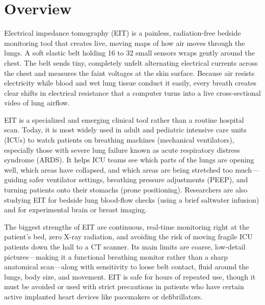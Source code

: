 \label{ch:infographic-eit}

\section{Overview}

Electrical impedance tomography (EIT) is a painless, radiation-free bedside monitoring tool that creates live, moving maps of how air moves through the lungs. A soft elastic belt holding 16 to 32 small sensors wraps gently around the chest. The belt sends tiny, completely unfelt alternating electrical currents across the chest and measures the faint voltages at the skin surface. Because air resists electricity while blood and wet lung tissue conduct it easily, every breath creates clear shifts in electrical resistance that a computer turns into a live cross-sectional video of lung airflow.

EIT is a specialized and emerging clinical tool rather than a routine hospital scan. Today, it is most widely used in adult and pediatric intensive care units (ICUs) to watch patients on breathing machines (mechanical ventilators), especially those with severe lung failure known as acute respiratory distress syndrome (ARDS). It helps ICU teams see which parts of the lungs are opening well, which areas have collapsed, and which areas are being stretched too much---guiding safer ventilator settings, breathing pressure adjustments (PEEP), and turning patients onto their stomachs (prone positioning). Researchers are also studying EIT for bedside lung blood-flow checks (using a brief saltwater infusion) and for experimental brain or breast imaging.

The biggest strengths of EIT are continuous, real-time monitoring right at the patient's bed, zero X-ray radiation, and avoiding the risk of moving fragile ICU patients down the hall to a CT scanner. Its main limits are coarse, low-detail pictures---making it a functional breathing monitor rather than a sharp anatomical scan---along with sensitivity to loose belt contact, fluid around the lungs, body size, and movement. EIT is safe for hours of repeated use, though it must be avoided or used with strict precautions in patients who have certain active implanted heart devices like pacemakers or defibrillators.

